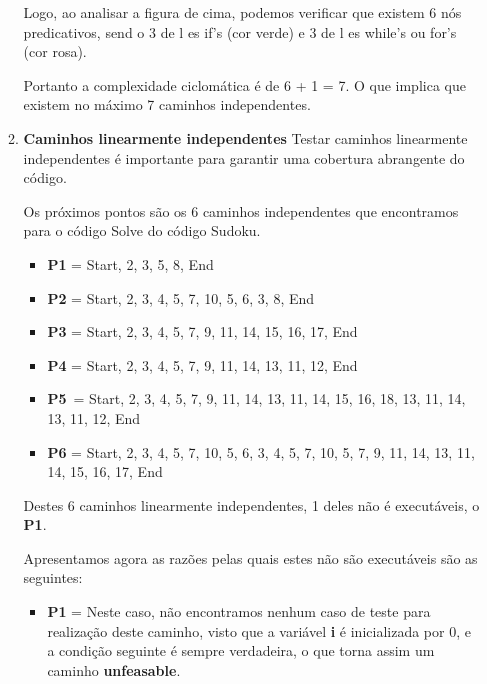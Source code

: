 \documentclass{article}
\begin{document}
\begin{itemize}
\begin{enumerate}
    \quad Logo, ao analisar a figura de cima, podemos verificar que existem 6 nós predicativos, send o  3  de l es if's (cor verde)  e  3  de l es while's ou for's (cor rosa).
  
    Portanto a complexidade ciclomática é de 6 + 1 = 7. O que implica que existem no máximo 7 caminhos independentes.
    
    \item \textbf{Caminhos linearmente independentes}
    Testar caminhos linearmente independentes é importante para garantir uma cobertura abrangente do código.

  Os próximos pontos são os 6 caminhos independentes que encontramos para o código Solve do código Sudoku.
  \begin{itemize}
    \item \textbf{P1} = {Start, 2, 3, 5, 8, End}
    \item \textbf{P2} = {Start, 2, 3, 4, 5, 7, 10, 5, 6, 3, 8, End}
    \item \textbf{P3} = {Start, 2, 3, 4, 5, 7, 9, 11, 14, 15, 16, 17, End} 
    \item \textbf{P4} = {Start, 2, 3, 4, 5, 7, 9, 11, 14, 13, 11, 12, End}
    \item \textbf{P5} = {Start, 2, 3, 4, 5, 7, 9, 11, 14, 13, 11, 14, 15, 16, 18, 13, 11, 14, 13, 11, 12, End}
   \item \textbf{P6} = {Start, 2, 3, 4, 5, 7, 10, 5, 6, 3, 4, 5, 7, 10, 5, 7, 9, 11, 14, 13, 11, 14, 15, 16, 17, End}
    \end{itemize}
    
  Destes 6 caminhos linearmente independentes, 1 deles não é executáveis, o \textbf{P1}.

  \quad Apresentamos agora as razões pelas quais estes não são executáveis são as seguintes: \\
  \begin{itemize}
    \item \textbf{P1} = Neste caso, não encontramos nenhum caso de teste para realização deste caminho, visto que a variável \textbf{i} é inicializada por 0, e a condição seguinte é sempre verdadeira, o que torna assim um caminho \textbf{unfeasable}.


\end{itemize}
\end{enumerate}
\end{itemize}
\end{document}
